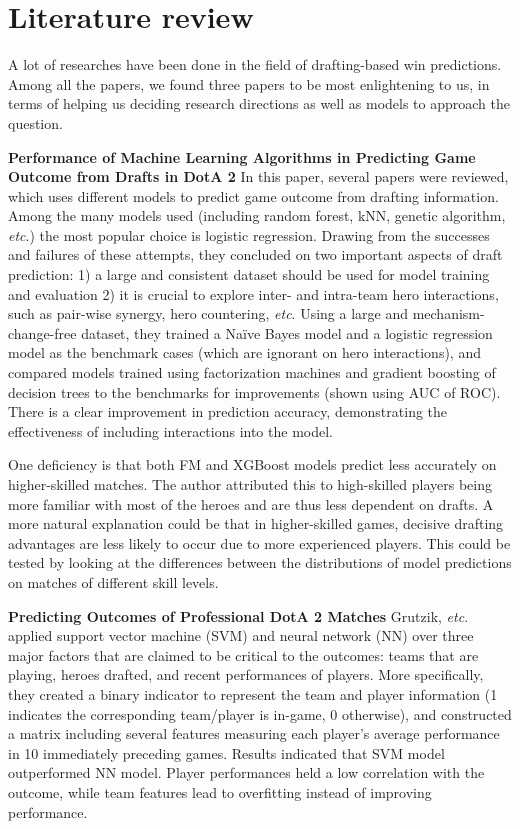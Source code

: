 \documentclass{article}
\begin{document}
\section{Literature review}
A lot of researches have been done in the field of drafting-based win predictions. Among all the papers, we found three papers to be most enlightening to us, in terms of helping us deciding research directions as well as models to approach the question.

\textbf{Performance of Machine Learning Algorithms in Predicting Game Outcome from Drafts in DotA 2\cite{semenov2016performance}}
In this paper, several papers were reviewed, which uses different models to predict game outcome from drafting information. Among the many models used (including random forest, kNN, genetic algorithm, \textit{etc}.) the most popular choice is logistic regression. Drawing from the successes and failures of these attempts, they concluded on two important aspects of draft prediction: 1) a large and consistent dataset should be used for model training and evaluation 2) it is crucial to explore inter- and intra-team hero interactions, such as pair-wise synergy, hero countering, \textit{etc}. Using a large and mechanism-change-free dataset, they trained a Naïve Bayes model and a logistic regression model as the benchmark cases (which are ignorant on hero interactions), and compared models trained using factorization machines and gradient boosting of decision trees to the benchmarks for improvements (shown using AUC of ROC). There is a clear improvement in prediction accuracy, demonstrating the effectiveness of including interactions into the model. 

One deficiency is that both FM and XGBoost models predict less accurately on higher-skilled matches. The author attributed this to high-skilled players being more familiar with most of the heroes and are thus less dependent on drafts. A more natural explanation could be that in higher-skilled games, decisive drafting advantages are less likely to occur due to more experienced players. This could be tested by looking at the differences between the distributions of model predictions on matches of different skill levels.

\textbf{Predicting Outcomes of Professional DotA 2 Matches\cite{grutzik2017predicting}}
Grutzik, \textit{etc}. applied support vector machine (SVM) and neural network (NN) over three major factors that are claimed to be critical to the outcomes: teams that are playing, heroes drafted, and recent performances of players. More specifically, they created a binary indicator to represent the team and player information (1 indicates the corresponding team/player is in-game, 0 otherwise), and constructed a matrix including several features measuring each player’s average performance in 10 immediately preceding games. Results indicated that SVM model outperformed NN model. Player performances held a low correlation with the outcome, while team features lead to overfitting instead of improving performance.
\end{document}
